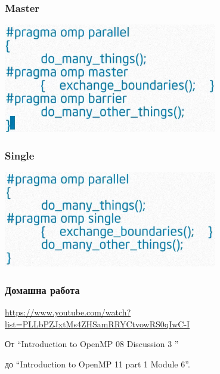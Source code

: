 \documentclass{beamer}
\begin{document}
\begin{frame}
  \frametitle{Master}
  \centering
  \includegraphics[width=0.7\textwidth]{master}
\end{frame}


\begin{frame}
  \frametitle{Single}
  \centering
  \includegraphics[width=0.7\textwidth]{single}
\end{frame}


\begin{frame}
  \frametitle{Домашна работа}
\url{https://www.youtube.com/watch?list=PLLbPZJxtMs4ZHSamRRYCtvowRS0qIwC-I}  

От ``Introduction to OpenMP 08 Discussion 3 ''
 
до ``Introduction to OpenMP 11 part 1 Module 6''.

\end{frame}
\end{document}

